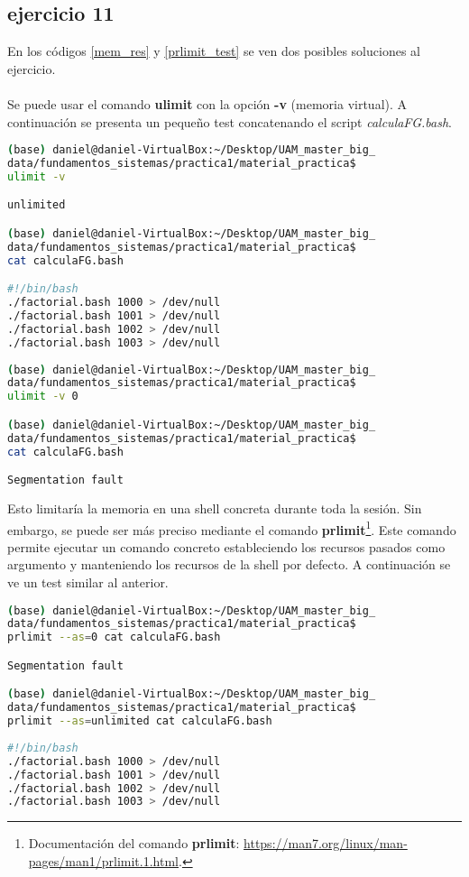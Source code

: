 \subsection*{ejercicio 11}
%
En los códigos \ref{mem_res} y \ref{prlimit_test} se ven dos posibles soluciones al ejercicio.\\\\
Se puede usar el comando \textbf{ulimit} con la opción \textbf{-v} (memoria virtual). A continuación se presenta un pequeño test concatenando el script \textit{calculaFG.bash}. 
\begin{lstlisting}[language=bash,caption={Restricción de memoria máxima en la Shell actual con ulimit}, label={mem_res}]
(base) daniel@daniel-VirtualBox:~/Desktop/UAM_master_big_
data/fundamentos_sistemas/practica1/material_practica$ 
ulimit -v

unlimited

(base) daniel@daniel-VirtualBox:~/Desktop/UAM_master_big_
data/fundamentos_sistemas/practica1/material_practica$ 
cat calculaFG.bash

#!/bin/bash
./factorial.bash 1000 > /dev/null
./factorial.bash 1001 > /dev/null
./factorial.bash 1002 > /dev/null
./factorial.bash 1003 > /dev/null
 
(base) daniel@daniel-VirtualBox:~/Desktop/UAM_master_big_
data/fundamentos_sistemas/practica1/material_practica$ 
ulimit -v 0

(base) daniel@daniel-VirtualBox:~/Desktop/UAM_master_big_
data/fundamentos_sistemas/practica1/material_practica$ 
cat calculaFG.bash

Segmentation fault
\end{lstlisting}
Esto limitaría la memoria en una shell concreta durante toda la sesión. Sin embargo, se puede ser más preciso mediante el comando \textbf{prlimit}\footnote{Documentación del comando \textbf{prlimit}: \url{https://man7.org/linux/man-pages/man1/prlimit.1.html}.}. Este comando permite ejecutar un comando concreto estableciendo los recursos pasados como argumento y manteniendo los recursos de la shell por defecto. A continuación se ve un test similar al anterior.
\begin{lstlisting}[language=bash,caption={Restricción de memoria máxima en la Shell actual con prlimit}, label={prlimit_test}]
(base) daniel@daniel-VirtualBox:~/Desktop/UAM_master_big_
data/fundamentos_sistemas/practica1/material_practica$ 
prlimit --as=0 cat calculaFG.bash

Segmentation fault

(base) daniel@daniel-VirtualBox:~/Desktop/UAM_master_big_
data/fundamentos_sistemas/practica1/material_practica$
prlimit --as=unlimited cat calculaFG.bash
 
#!/bin/bash
./factorial.bash 1000 > /dev/null
./factorial.bash 1001 > /dev/null
./factorial.bash 1002 > /dev/null
./factorial.bash 1003 > /dev/null 
\end{lstlisting}
